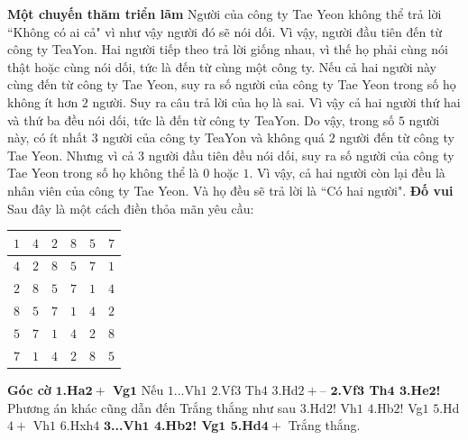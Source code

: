 \begin{multicols}{2}
	\textbf{\color{doisongtoanhoc}Một chuyến thăm triển lãm}
	\vskip 0.1cm
	Người của công ty Tae Yeon không thể trả lời ``Không có ai cả" vì như vậy người đó sẽ nói dối. Vì vậy, người đầu tiên đến từ công ty TeaYon.
	\vskip 0.1cm
	Hai người tiếp theo trả lời giống nhau, vì thế họ phải cùng nói thật hoặc cùng nói dối, tức là đến từ cùng một công ty.
	\vskip 0.1cm
	Nếu cả hai người này cùng đến từ công ty Tae Yeon, suy ra số người của công ty Tae Yeon trong số họ không ít hơn $2$ người. Suy ra câu trả lời của họ là sai. Vì vậy cả hai người thứ hai và thứ ba đều nói dối, tức là đến từ công ty TeaYon.
	\vskip 0.1cm
	Do vậy, trong số $5$ người này, có ít nhất $3$ người của công ty TeaYon và không quá $2$ người đến từ công ty Tae Yeon.
	\vskip 0.1cm
	Nhưng vì cả $3$ người đầu tiên đều nói dối, suy ra số người của công ty Tae Yeon trong số họ không thể là $0$ hoặc $1$. Vì vậy, cả hai người còn lại đều là nhân viên của công ty Tae Yeon. Và họ đều sẽ trả lời là ``Có hai người".
	\vskip 0.1cm
	\textbf{\color{doisongtoanhoc}Đố vui}
	\vskip 0.1cm
	Sau đây là một cách điền thỏa mãn yêu cầu:
	\begin{table}[H]
		\vspace*{-5pt}
		\centering
		\captionsetup{labelformat= empty, justification=centering}
		\setlength{\tabcolsep}{8pt}
		\renewcommand{\arraystretch}{1.2}
		\begin{tabular}{|c|c|c|c|c|c|}
			\hline
			$1$&$4$&$2$&$8$&$5$&$7$\\
			\hline
			$4$&$2$&$8$&$5$&$7$&$1$\\
			\hline
			$2$&$8$&$5$&$7$&$1$&$4$\\
			\hline
			$8$&$5$&$7$&$1$&$4$&$2$\\
			\hline
			$5$&$7$&$1$&$4$&$2$&$8$\\
			\hline
			$7$&$1$&$4$&$2$&$8$&$5$\\
			\hline
		\end{tabular}
		\vspace*{-10pt}
	\end{table}
	\textbf{\color{doisongtoanhoc}Góc cờ}
	\vskip 0.1cm
	$\pmb{1}$\textbf{\color{doisongtoanhoc}.Ha$\pmb{2+}$ Vg}$\pmb{1}$ Nếu $1$...Vh$1$ $2$.Vf$3$ Th$4$ $3$.Hd$2+–$
	\vskip 0.1cm
	$\pmb{2}$\textbf{\color{doisongtoanhoc}.Vf$\pmb{3}$ Th$\pmb{4}$ $\pmb{3}$.He$\pmb{2}$!} Phương án khác cũng dẫn đến Trắng thắng như sau $3$.Hd$2$! Vh$1$ $4$.Hb$2$! Vg$1$ $5$.Hd$4+$ Vh$1$ $6$.Hxh$4$
	\vskip 0.1cm
	$\pmb{3}$\textbf{\color{doisongtoanhoc}...Vh$\pmb{1}$ $\pmb{4}$.Hb$\pmb{2}$! Vg$\pmb{1}$ $\pmb{5}$.Hd}$\pmb{4+}$ Trắng thắng.
\end{multicols}

